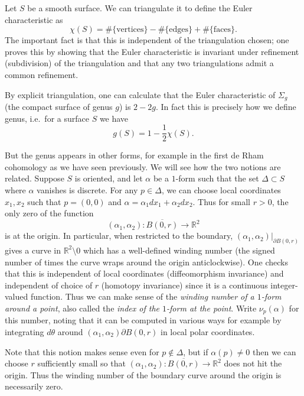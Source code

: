 Let \(S\) be a smooth surface. We can triangulate it to define the Euler
characteristic as
\[
    \chi(S)=\#\{\text{vertices}\}-\#\{\text{edges}\}+\#\{\text{faces}\}.
\]
The important fact is that this is independent of the triangulation chosen;
one proves this by showing that the Euler characteristic is invariant under
refinement (subdivision) of the triangulation and that any two triangulations
admit a common refinement.

By explicit triangulation, one can calculate that the Euler
characteristic of \(\Sigma_g\) (the compact surface of genus \(g\)) is
\(2-2g\). In fact this is precisely how we define genus, i.e.\ for a surface
\(S\) we have
\[
    g(S)=1-\frac{1}{2}\chi(S).
\]

But the genus appears in other forms, for example in the first de Rham
cohomology as we have seen previously. We will see how the two notions are
related. Suppose \(S\) is oriented, and let
\(\alpha\) be a \(1\)-form such that the set \(\Delta\subset S\) where
\(\alpha\) vanishes is discrete. For any \(p\in \Delta\), we can choose local
coordinates \(x_1,x_2\) such that \(p=(0,0)\) and
\(\alpha=\alpha_1dx_1+\alpha_2dx_2\). Thus for small \(r>0\), the only zero of the function
\[
    (\alpha_1,\alpha_2): \overline{B(0,r)}\to \mathbb{R}^2
\]
is at the origin. In particular, when restricted to the boundary,
\((\alpha_1,\alpha_2)|_{\partial B(0,r)}\) gives a curve in
\(\mathbb{R}^2\setminus 0\) which has a well-defined winding number (the
signed number of times the curve wraps around the origin anticlockwise). One
checks that this is independent of local coordinates (diffeomorphism invariance)
and independent of choice of \(r\) (homotopy invariance) since it is a
continuous integer-valued function. Thus we can make sense of the
\textit{winding number of a \(1\)-form around a point}, also called the
\textit{index of the \(1\)-form at the point}.  Write
\(\nu_p(\alpha)\) for this number, noting that it can be computed in various ways for example by integrating \(d\theta\) around \((\alpha_1,\alpha_2)\partial
B(0,r)\)  in local polar coordinates.

Note that this notion makes sense even for \(p\notin \Delta\), but if
\(\alpha(p)\neq 0\) then we can choose \(r\) sufficiently small so that
\((\alpha_1,\alpha_2):\overline{B(0,r)}\to \mathbb{R}^2\) does not hit the
origin. Thus the winding number of the boundary curve around the origin is
necessarily zero.

